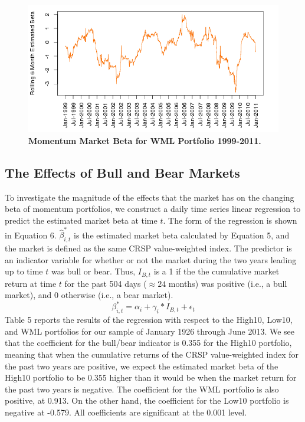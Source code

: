 \documentclass[12pt]{article}
\begin{document}
\begin{figure}[p]
\centering
\caption{\textbf{Momentum Market Beta for WML Portfolio 1999-2011.}}
\includegraphics[scale=0.6]{betaWML1999.png}
\end{figure}

\subsection{The Effects of Bull and Bear Markets}

To investigate the magnitude of the effects that the market has on the changing beta of momentum portfolios, we construct a daily time series linear regression to predict the estimated market beta at time $t$. The form of the regression is shown in Equation 6. $\hat{\beta}^{*}_{i,t}$ is the estimated market beta calculated by Equation 5, and the market is defined as the same CRSP value-weighted index. The predictor is an indicator variable for whether or not the market during the two years leading up to time $t$ was bull or bear. Thus, $I_{B,t}$ is a 1 if the the cumulative market return at time $t$ for the past 504 days ($\approx 24$ months) was positive (i.e., a bull market), and 0 otherwise (i.e., a bear market). 
\begin{equation}
\beta_{i,t}^{*}=\alpha_{i}+\gamma_{i}*I_{B,t} + \epsilon_{t}
\end{equation}
Table 5 reports the results of the regression with respect to the High10, Low10, and WML portfolios for our sample of January 1926 through June 2013. We see that the coefficient for the bull/bear indicator is 0.355 for the High10 portfolio, meaning that when the cumulative returns of the CRSP value-weighted index for the past two years are positive, we expect the estimated market beta of the High10 portfolio to be 0.355 higher than it would be when the market return for the past two years is negative. The coefficient for the WML portfolio is also positive, at 0.913. On the other hand, the coefficient for the Low10 portfolio is negative at -0.579. All coefficients are significant at the 0.001 level.
\end{document}
